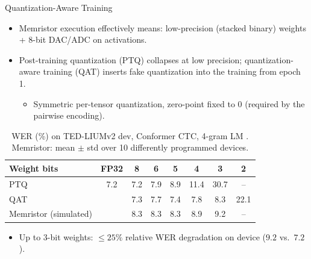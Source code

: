 \begin{frame}{Quantization-Aware Training}
  \begin{itemize}
    \setlength{\itemsep}{6pt}
    \item Memristor execution effectively means: low-precision (stacked binary) weights
          + 8-bit DAC/ADC on activations.
    \item Post-training quantization (PTQ) collapses at low precision;
          quantization-aware training (QAT) \cite{gholami2021survey} inserts
          fake quantization into the training from epoch 1.
          \begin{itemize}
            \item Symmetric per-tensor quantization, zero-point fixed to 0
                  (required by the pairwise encoding).
          \end{itemize}
  \end{itemize}
  \vfill
  \begin{table}[h]
    \centering
    \caption{WER (\%) on TED-LIUMv2 dev, Conformer CTC, 4-gram LM
      \cite{rossenbach2025memristor}. Memristor: mean $\pm$ std over 10
      differently programmed devices.}
    \label{tab:anchor-results}
    \small
    \begin{tabular}{l c c c c c c c}
      \toprule
      Weight bits           & FP32 & 8   & 6   & 5   & 4    & 3    & 2    \\
      \midrule
      PTQ                   & 7.2  & 7.2 & 7.9 & 8.9 & 11.4 & 30.7 & --   \\
      QAT                   &      & 7.3 & 7.7 & 7.4 & 7.8  & 8.3  & 22.1 \\
      Memristor (simulated) &      & 8.3 & 8.3 & 8.3 & 8.9  & 9.2  & --   \\
      \bottomrule
    \end{tabular}
  \end{table}
  \vfill
  \begin{itemize}
    \item Up to 3-bit weights: $\leq 25\%$ relative WER degradation on device
          ($9.2$ vs.\ $7.2$).
  \end{itemize}
\end{frame}
